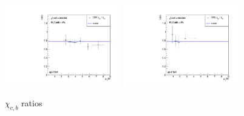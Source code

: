 \documentclass{article}
\begin{document}
\begin{figure}
\centering
\includegraphics[width = 0.45\textwidth]{chic_ratio.pdf}
\includegraphics[width = 0.45\textwidth]{chib_ratio.pdf}
\caption{$\chi_{c,b}$ ratios}
\end{figure}
\end{document}
